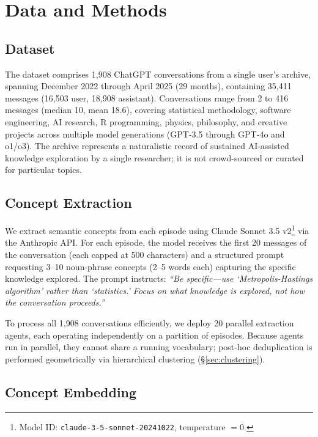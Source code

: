 \documentclass{svproc}
\begin{document}
\section{Data and Methods}
\label{sec:methods}

\subsection{Dataset}

The dataset comprises 1,908 ChatGPT conversations from a single user's archive,
spanning December 2022 through April 2025 (29 months), containing 35,411
messages (16,503 user, 18,908 assistant). Conversations range from 2 to 416
messages (median 10, mean 18.6), covering statistical methodology, software
engineering, AI research, R programming, physics, philosophy, and creative
projects across multiple model generations (GPT-3.5 through GPT-4o and o1/o3).
The archive represents a naturalistic record of sustained AI-assisted knowledge
exploration by a single researcher; it is not crowd-sourced or curated for
particular topics.

\subsection{Concept Extraction}

We extract semantic concepts from each episode using Claude Sonnet
3.5 v2\footnote{Model ID: \texttt{claude-3-5-sonnet-20241022}, temperature $= 0$.}
via the Anthropic API. For each episode, the model receives the first
20 messages of the conversation (each capped at 500 characters) and a
structured prompt requesting 3--10 noun-phrase
concepts (2--5 words each) capturing the specific knowledge explored. The
prompt instructs: \emph{``Be specific---use `Metropolis-Hastings algorithm'
rather than `statistics.' Focus on what knowledge is explored, not how the
conversation proceeds.''}

To process all 1,908 conversations efficiently, we deploy 20 parallel
extraction agents, each operating independently on a partition of episodes.
Because agents run in parallel, they cannot share a running vocabulary;
post-hoc deduplication is performed geometrically via hierarchical clustering
(\S\ref{sec:clustering}).

\subsection{Concept Embedding}
\end{document}
